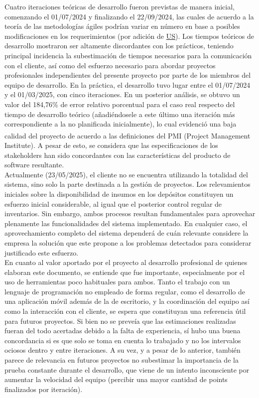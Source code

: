 \documentclass[a4paper, 12pt,twoside]{report}  %
\numberwithin{equation}{subsection} %
\begin{document}
\indent Cuatro iteraciones teóricas de desarrollo fueron previstas de manera inicial, comenzando el 01/07/2024 y finalizando el 22/09/2024, las cuales de acuerdo a la teoría de las metodologías ágiles podrían variar en número en base a posibles modificaciones en los requerimientos (por adición de \hyperlink{US}{US}). Los tiempos teóricos de desarrollo mostraron ser altamente discordantes con los prácticos, teniendo principal incidencia la subestimación de tiempos necesarios para la comunicación con el cliente, así como del esfuerzo necesario para abordar proyectos profesionales independientes del presente proyecto por parte de los miembros del equipo de desarrollo. En la práctica, el desarrollo tuvo lugar entre el 01/07/2024 y el 01/03/2025, con cinco iteraciones. En un posterior análisis, se obtuvo un valor del 184,76\% de error relativo porcentual para el caso real respecto del tiempo de desarrollo teórico (añadiéndosele a este último una iteración más correspondiente a la no planificada inicialmente), lo cual evidenció una baja calidad del proyecto de acuerdo a las definiciones del PMI\textsuperscript{\tiny\textregistered} (Project Management Institute). A pesar de esto, se considera que las especificaciones de los stakeholders han sido concordantes con las características del producto de software resultante.\\
\indent Actualmente (23/05/2025), el cliente no se encuentra utilizando la totalidad del sistema, sino solo la parte destinada a la gestión de proyectos. Los relevamientos iniciales sobre la disponibilidad de insumos en los depósitos constituyen un esfuerzo inicial considerable, al igual que el posterior control regular de inventarios. Sin embargo, ambos procesos resultan fundamentales para aprovechar plenamente las funcionalidades del sistema implementado. En cualquier caso, el aprovechamiento completo del sistema dependerá de cuán relevante considere la empresa la solución que este propone a los problemas detectados para considerar justificado este esfuerzo.\\
\indent En cuanto al valor aportado por el proyecto al desarrollo profesional de quienes elaboran este documento, se entiende que fue importante, especialmente por el uso de herramientas poco habituales para ambos. Tanto el trabajo con un lenguaje de programación no empleado de forma regular, como el desarrollo de una aplicación móvil además de la de escritorio, y la coordinación del equipo así como la interacción con el cliente, se espera que constituyan una referencia útil para futuros proyectos. Si bien no se preveía que las estimaciones realizadas fueran del todo acertadas debido a la falta de experiencia, sí hubo una buena concordancia si es que solo se toma en cuenta lo trabajado y no los intervalos ociosos dentro y entre iteraciones. A su vez, y a pesar de lo anterior, también parece de relevancia en futuros proyectos no subestimar la importancia de la prueba constante durante el desarrollo, que viene de un intento inconsciente por aumentar la velocidad del equipo (percibir una mayor cantidad de points finalizados por iteración).
\end{document}
